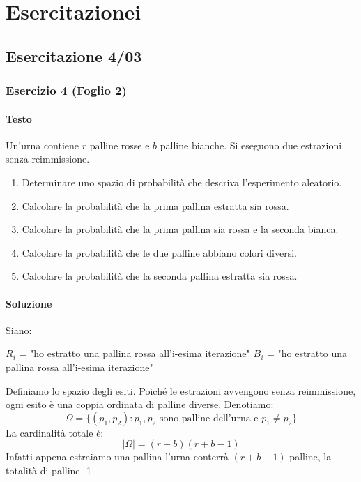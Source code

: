 % 
\chapter{Esercitazionei}

\section{Esercitazione 4/03}
\subsection{Esercizio 4 (Foglio 2)}
\subsubsection{Testo}
Un’urna contiene \(r\) palline rosse e \(b\) palline bianche. Si eseguono due estrazioni senza reimmissione.
\begin{enumerate}[label=(\alph*)]
    \item Determinare uno spazio di probabilità che descriva l’esperimento aleatorio.
    \item Calcolare la probabilità che la prima pallina estratta sia rossa.
    \item Calcolare la probabilità che la prima pallina sia rossa e la seconda bianca.
    \item Calcolare la probabilità che le due palline abbiano colori diversi.
    \item Calcolare la probabilità che la seconda pallina estratta sia rossa.
\end{enumerate}

\subsubsection{Soluzione}
Siano:

$R_i$ = "ho estratto una pallina rossa all'i-esima iterazione"
$B_i$ = "ho estratto una pallina rossa all'i-esima iterazione"

Definiamo lo spazio degli esiti. Poiché le estrazioni avvengono senza reimmissione, ogni esito è una coppia ordinata di palline diverse. Denotiamo:
\[
    \Omega = \{ (p_1, p_2) : p_1, p_2 \text{ sono palline dell'urna e } p_1 \neq p_2 \}
\]
La cardinalità totale è:
\[
    |\Omega| = (r+b)(r+b-1)
\]
Infatti appena estraiamo una pallina l'urna conterrà $(r+b-1)$ palline, la totalità di palline -1

